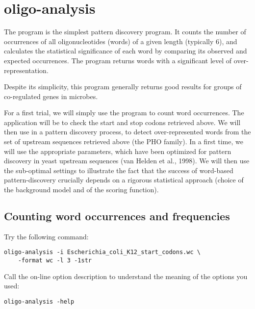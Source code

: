 \section{oligo-analysis}

The program  is the simplest pattern discovery
program. It counts the number of occurrences of all oligonucleotides
(words) of a given length (typically 6), and calculates the
statistical significance of each word by comparing its observed and
expected occurrences. The program returns words with a significant
level of over-representation.

Despite its simplicity, this program generally returns good results
for groups of co-regulated genes in microbes.

For a first trial, we will simply use the program to count word
occurrences. The application will be to check the start and stop
codons retrieved above. We will then use  in a
pattern discovery process, to detect over-represented words from the
set of upstream sequences retrieved above (the PHO family).  In a
first time, we will use the appropriate parameters, which have been
optimized for pattern discovery in yeast upstream sequences (van
Helden et al., 1998). We will then use the sub-optimal settings to
illustrate the fact that the success of word-based pattern-discovery
crucially depends on a rigorous statistical approach (choice of the
background model and of the scoring function).

\subsection{Counting word occurrences and frequencies}

Try the following command:

{\color{Blue} \begin{footnotesize} 
\begin{verbatim}
oligo-analysis -i Escherichia_coli_K12_start_codons.wc \
    -format wc -l 3 -1str
\end{verbatim} \end{footnotesize}
}


Call the on-line option description to understand the meaning of the
options you used:

{\color{Blue} \begin{footnotesize} 
\begin{verbatim}
oligo-analysis -help
\end{verbatim} \end{footnotesize}
}



